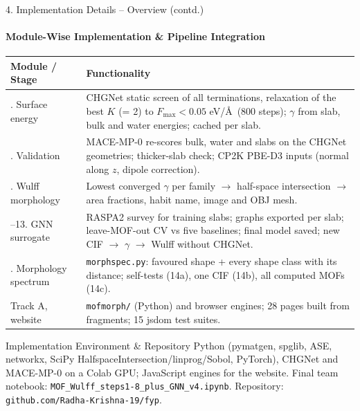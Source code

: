 \documentclass[aspectratio=169, 11pt]{beamer}
\begin{document}
\begin{frame}[shrink=6]{4. Implementation Details -- Overview (contd.)}
    \framesubtitle{Module-Wise Implementation \& Pipeline Integration}
    \begin{table}
        \centering
        \scriptsize
        \renewcommand{\arraystretch}{1.18}
        \begin{tabular}{>{\raggedright\arraybackslash}p{3.0cm} >{\raggedright\arraybackslash}p{11.4cm}}
            \toprule
            \textbf{Module / Stage} & \textbf{Functionality} \\
            \midrule
            6. Surface energy & CHGNet static screen of all terminations, relaxation of the best $K$ (= 2) to $F_\text{max} < 0.05$ eV/\AA\ (800 steps); $\gamma$ from slab, bulk and water energies; cached per slab. \\
            7. Validation & MACE-MP-0 re-scores bulk, water and slabs on the CHGNet geometries; thicker-slab check; CP2K PBE-D3 inputs (normal along $z$, dipole correction). \\
            8. Wulff morphology & Lowest converged $\gamma$ per family $\rightarrow$ half-space intersection $\rightarrow$ area fractions, habit name, image and OBJ mesh. \\
            9--13. GNN surrogate & RASPA2 survey for training slabs; graphs exported per slab; leave-MOF-out CV vs five baselines; final model saved; new CIF $\rightarrow$ $\gamma$ $\rightarrow$ Wulff without CHGNet. \\
            14. Morphology spectrum & \texttt{morphspec.py}: favoured shape + every shape class with its distance; self-tests (14a), one CIF (14b), all computed MOFs (14c). \\
            Track A, website & \texttt{mofmorph/} (Python) and browser engines; 28 pages built from fragments; 15 jsdom test suites. \\
            \bottomrule
        \end{tabular}
    \end{table}
    \begin{block}{Implementation Environment \& Repository}
        \scriptsize Python (pymatgen, spglib, ASE, networkx, SciPy HalfspaceIntersection/linprog/Sobol, PyTorch), CHGNet and MACE-MP-0 on a Colab GPU; JavaScript engines for the website. Final team notebook: \texttt{MOF\_Wulff\_steps1-8\_plus\_GNN\_v4.ipynb}. Repository: \texttt{github.com/Radha-Krishna-19/fyp}.
    \end{block}
\end{frame}
\end{document}
